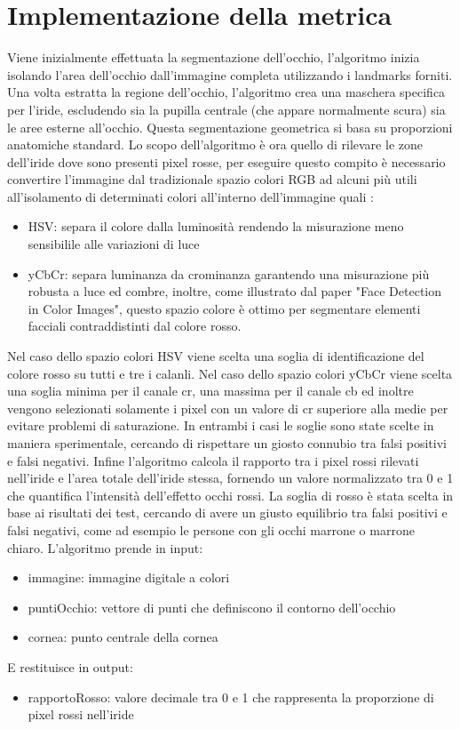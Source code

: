 \documentclass[12pt,a4paper,openright,twoside]{book}
\begin{document}
\section{Implementazione della metrica}
Viene inizialmente effettuata la segmentazione dell'occhio, l'algoritmo inizia isolando l'area dell'occhio dall'immagine completa utilizzando i landmarks forniti.
Una volta estratta la regione dell'occhio, l'algoritmo crea una maschera specifica per l'iride, escludendo sia la pupilla centrale (che appare normalmente scura) sia le aree esterne all'occhio. Questa segmentazione geometrica si basa su proporzioni anatomiche standard.
Lo scopo dell'algoritmo è ora quello di rilevare le zone dell'iride dove sono presenti pixel rosse, per eseguire questo compito è necessario convertire l'immagine dal tradizionale spazio colori RGB ad alcuni più utili all'isolamento di determinati colori all'interno dell'immagine quali : \begin{itemize}
    \item HSV: separa il colore dalla luminosità rendendo la misurazione meno sensibilile alle variazioni di luce
    \item yCbCr: separa luminanza da crominanza garantendo una misurazione più robusta a luce ed combre, inoltre, come illustrato dal paper "Face Detection in Color Images", questo spazio colore è ottimo per segmentare elementi facciali contraddistinti dal colore rosso.
\end{itemize}
Nel caso dello spazio colori HSV viene scelta una soglia di identificazione del colore rosso su tutti e tre i calanli.
Nel caso dello spazio colori yCbCr viene scelta una soglia minima per il canale cr, una massima per il canale cb ed inoltre vengono selezionati solamente i pixel con un valore di cr superiore alla medie per evitare problemi di saturazione.
In entrambi i casi le soglie sono state scelte in maniera sperimentale, cercando di rispettare un giosto connubio tra falsi positivi e falsi negativi.
Infine l'algoritmo calcola il rapporto tra i pixel rossi rilevati nell'iride e l'area totale dell'iride stessa, fornendo un valore normalizzato tra 0 e 1 che quantifica l'intensità dell'effetto occhi rossi.
La soglia di rosso è stata scelta in base ai risultati dei test, cercando di avere un giusto equilibrio tra falsi positivi e falsi negativi, come ad esempio le persone con gli occhi marrone o marrone chiaro.
L'algoritmo prende in input:
\begin{itemize}
    \item immagine: immagine digitale a colori
    \item puntiOcchio: vettore di punti che definiscono il contorno dell'occhio
    \item cornea: punto centrale della cornea
\end{itemize}
E restituisce in output:
\begin{itemize}
    \item rapportoRosso: valore decimale tra 0 e 1 che rappresenta la proporzione di pixel rossi nell'iride
\end{itemize}
\end{document}
